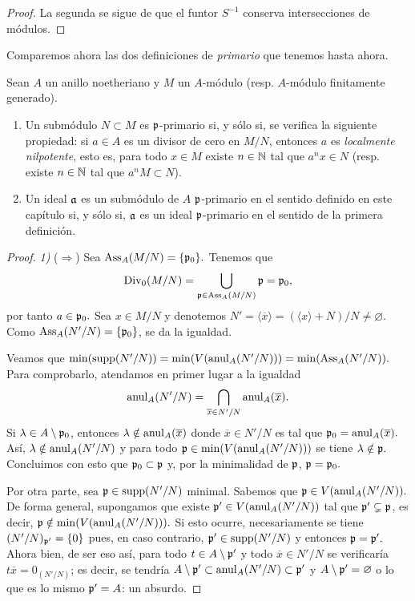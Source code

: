 \documentclass[../main.tex]{subfiles}
\begin{document}
\begin{theorem}
\begin{proof}
	La segunda se sigue de que el funtor $S^{-1}$ conserva intersecciones de módulos.
\end{proof}

Comparemos ahora las dos definiciones de \textit{primario} que tenemos hasta ahora.

\begin{proposition}
	Sean $A$ un anillo noetheriano y $M$ un $A$-módulo (resp. $A$-módulo finitamente generado).
	\begin{enumerate}
		\item Un submódulo $N\subset M$ es $\mathfrak{p}$-primario si, y sólo si, se verifica la siguiente propiedad: si $a\in A$ es un divisor de cero en $M/N$, entonces $a$ es \textit{localmente nilpotente}, esto es, para todo $x\in M$ existe $n\in\mathbb{N}$ tal que $a^nx\in N$ (resp. existe $n\in\mathbb{N}$ tal que $a^nM\subset N$).
		\item Un ideal $\mathfrak{a}$ es un submódulo de $A$ $\mathfrak{p}$-primario en el sentido definido en este capítulo si, y sólo si, $\mathfrak{a}$ es un ideal $\mathfrak{p}$-primario en el sentido de la primera definición.
	\end{enumerate}
\end{proposition}

\begin{proof} \textit{1)} ($\Rightarrow$)
	Sea $\text{Ass}_A(M/N)=\{\mathfrak{p}_0\}.$ Tenemos que
	$$\operatorname{Div}_0(M/N)=\bigcup_{\mathfrak{p}\in\text{Ass}_A(M/N)}\mathfrak{p}=\mathfrak{p}_0,$$
	por tanto $a\in\mathfrak{p}_0.$ Sea $x\in M/N$ y denotemos $N'=\langle\overline{x}\rangle=(\langle x\rangle +N)/N\neq\varnothing.$ Como $\text{Ass}_A(N'/N)=\{\mathfrak{p}_0\}$, se da la igualdad.
	
	Veamos que $\min(\operatorname{supp}(N'/N))=\min(V(\operatorname{anul}_A(N'/N)))=\min(\text{Ass}_A(N'/N)).$ Para comprobarlo, atendamos en primer lugar a la igualdad
	$$\operatorname{anul}_A(N'/N)=\bigcap_{\overline{x}\in N'/N}\operatorname{anul}_A(\overline{x}).$$
	Si $\lambda\in A\setminus\mathfrak{p}_0$, entonces $\lambda\notin\operatorname{anul}_A(\overline{x})$ donde $\overline{x}\in N'/N$ es tal que $\mathfrak{p}_0=\operatorname{anul}_A(\overline{x}).$ Así, $\lambda\notin\operatorname{anul}_A(N'/N)$ y para todo $\mathfrak{p}\in \min(V(\operatorname{anul}_A(N'/N)))$ se tiene $\lambda\notin\mathfrak{p}.$ Concluimos con esto que $\mathfrak{p}_0\subset\mathfrak{p}$ y, por la minimalidad de $\mathfrak{p}$, $\mathfrak{p}=\mathfrak{p}_0.$ 
	
	Por otra parte, sea $\mathfrak{p}\in\operatorname{supp} (N'/N)$ minimal. Sabemos que $\mathfrak{p}\in V(\operatorname{anul}_A (N'/N)).$ De forma general, supongamos que existe $\mathfrak{p}'\in V(\operatorname{anul}_A(N'/N))$ tal que $\mathfrak{p}'\subsetneq\mathfrak{p}$, es decir, $\mathfrak{p}\notin\min(V(\operatorname{anul}_A(N'/N))).$ Si esto ocurre, necesariamente se tiene $(N'/N)_{\mathfrak{p}'}=\{0\}$ pues, en caso contrario, $\mathfrak{p}'\in\operatorname{supp} (N'/N)$ y entonces $\mathfrak{p}=\mathfrak{p}'.$ Ahora bien, de ser eso así, para todo $t\in A\setminus\mathfrak{p}'$ y todo $\overline{x}\in N'/N$ se verificaría $t\overline{x}=0_{(N'/N)}$; es decir, se tendría $A\setminus\mathfrak{p}'\subset\operatorname{anul}_A(N'/N)\subset\mathfrak{p}'$ y $A\setminus\mathfrak{p}'=\varnothing$ o lo que es lo mismo $\mathfrak{p}'=A$: un absurdo.
	

\end{proof}
\end{theorem}
\end{document}
